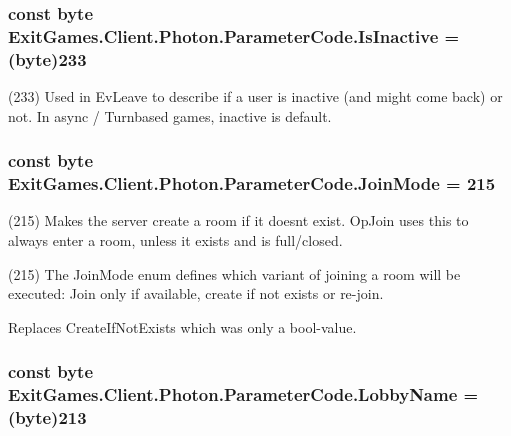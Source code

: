 \subsubsection[{\texorpdfstring{Is\+Inactive}{IsInactive}}]{\setlength{\rightskip}{0pt plus 5cm}const byte Exit\+Games.\+Client.\+Photon.\+Parameter\+Code.\+Is\+Inactive = (byte)233}\hypertarget{class_exit_games_1_1_client_1_1_photon_1_1_parameter_code_add307b46f4a69da70ff2e917d9e36da6}{}\label{class_exit_games_1_1_client_1_1_photon_1_1_parameter_code_add307b46f4a69da70ff2e917d9e36da6}


(233) Used in Ev\+Leave to describe if a user is inactive (and might come back) or not. In async / Turnbased games, inactive is default.

\subsubsection[{\texorpdfstring{Join\+Mode}{JoinMode}}]{\setlength{\rightskip}{0pt plus 5cm}const byte Exit\+Games.\+Client.\+Photon.\+Parameter\+Code.\+Join\+Mode = 215}\hypertarget{class_exit_games_1_1_client_1_1_photon_1_1_parameter_code_ac9b4c279b2c2447d2b6a92d048279534}{}\label{class_exit_games_1_1_client_1_1_photon_1_1_parameter_code_ac9b4c279b2c2447d2b6a92d048279534}


(215) Makes the server create a room if it doesn\textquotesingle{}t exist. Op\+Join uses this to always enter a room, unless it exists and is full/closed.

(215) The Join\+Mode enum defines which variant of joining a room will be executed\+: Join only if available, create if not exists or re-\/join.

Replaces Create\+If\+Not\+Exists which was only a bool-\/value.
\subsubsection[{\texorpdfstring{Lobby\+Name}{LobbyName}}]{\setlength{\rightskip}{0pt plus 5cm}const byte Exit\+Games.\+Client.\+Photon.\+Parameter\+Code.\+Lobby\+Name = (byte)213}\hypertarget{class_exit_games_1_1_client_1_1_photon_1_1_parameter_code_a9fa51cb55e1c0c7d02e372d57279e639}{}\label{class_exit_games_1_1_client_1_1_photon_1_1_parameter_code_a9fa51cb55e1c0c7d02e372d57279e639}


